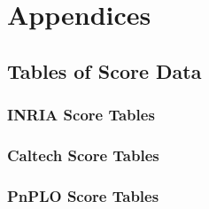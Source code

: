 \appendix
\section{Appendices}

\subsection{Tables of Score Data}\label{appendix:tables_of_data}
\newpage
\subsubsection{INRIA Score Tables}

\subsubsection{Caltech Score Tables}

\subsubsection{PnPLO Score Tables}

